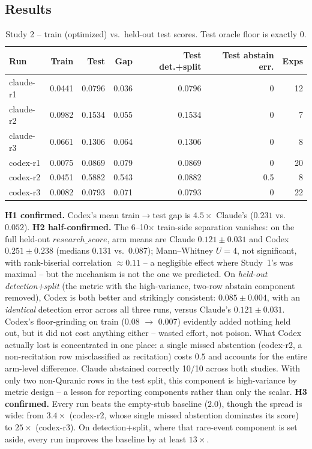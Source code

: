 \documentclass[runningheads]{llncs}
\newcommand{\rscore}{\ensuremath{\mathit{research\_score}}}
\begin{document}
\subsection{Results}

\begin{table}[t]
\centering
\caption{Study 2 -- train (optimized) vs.\ held-out test scores. Test oracle
floor is exactly 0.}
\label{tab:study2-headline}
\begin{tabular}{lrrrrrr}
\toprule
Run & Train & Test & Gap & Test det.+split & Test abstain err. & Exps \\
\midrule
claude-r1 & 0.0441 & 0.0796 & 0.036 & 0.0796 & 0    & 12 \\
claude-r2 & 0.0982 & 0.1534 & 0.055 & 0.1534 & 0    & 7  \\
claude-r3 & 0.0661 & 0.1306 & 0.064 & 0.1306 & 0    & 8  \\
codex-r1  & 0.0075 & 0.0869 & 0.079 & 0.0869 & 0    & 20 \\
codex-r2  & 0.0451 & 0.5882 & 0.543 & 0.0882 & 0.5  & 8  \\
codex-r3  & 0.0082 & 0.0793 & 0.071 & 0.0793 & 0    & 22 \\
\bottomrule
\end{tabular}
\end{table}

\textbf{H1 confirmed.} Codex's mean train$\to$test gap is $4.5\times$
Claude's ($0.231$ vs.\ $0.052$). \textbf{H2 half-confirmed.} The 6--10$\times$
train-side separation vanishes: on the full held-out \rscore, arm means are
Claude $0.121\pm0.031$ and Codex $0.251\pm0.238$ (medians $0.131$ vs.\
$0.087$); Mann--Whitney $U=4$, not significant, with rank-biserial
correlation $\approx 0.11$ -- a negligible effect where Study~1's was
maximal -- but the mechanism is not the one
we predicted. On \emph{held-out detection+split} (the metric with the
high-variance, two-row abstain component removed), Codex is both better and
strikingly consistent: $0.085\pm0.004$, with an \emph{identical} detection
error across all three runs, versus Claude's $0.121\pm0.031$. Codex's
floor-grinding on train (0.08 $\to$ 0.007) evidently added nothing held out,
but it did not cost anything either -- wasted effort, not poison. What Codex
actually lost is concentrated in one place: a single missed abstention
(codex-r2, a non-recitation row misclassified as recitation) costs $0.5$ and
accounts for the entire arm-level difference. Claude abstained correctly
10/10 across both studies. With only two non-Quranic rows in the test
split, this component is high-variance by metric design -- a lesson for
reporting components rather than only the scalar. \textbf{H3 confirmed.}
Every run beats the empty-stub baseline ($2.0$), though the spread is wide:
from $3.4\times$ (codex-r2, whose single missed abstention dominates its
score) to $25\times$ (codex-r3). On detection+split, where that rare-event
component is set aside, every run improves the baseline by at least
$13\times$.
\end{document}
